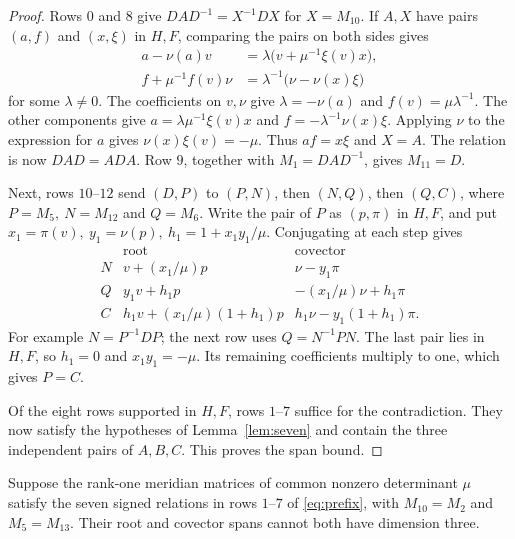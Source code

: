 \begin{proof}
Rows \(0\) and \(8\) give \(DAD^{-1}=X^{-1}DX\) for
\(X=M_{10}\). If \(A,X\) have pairs \((a,f)\) and \((x,\xi)\)
in \(H,F\), comparing the pairs on both sides gives
\[
 \begin{aligned}
 a-\nu(a)v &= \lambda\bigl(v+\mu^{-1}\xi(v)x\bigr),\\
 f+\mu^{-1}f(v)\nu &= \lambda^{-1}\bigl(\nu-\nu(x)\xi\bigr)
 \end{aligned}
\]
for some \(\lambda\ne 0\). The coefficients on \(v,\nu\)
give \(\lambda=-\nu(a)\) and \(f(v)=\mu\lambda^{-1}\).
The other components give
\(a=\lambda\mu^{-1}\xi(v)x\) and \(f=-\lambda^{-1}\nu(x)\xi\).
Applying \(\nu\) to the expression for \(a\) gives
\(\nu(x)\xi(v)=-\mu\). Thus \(af=x\xi\) and \(X=A\).
The relation is now \(DAD=ADA\).
Row \(9\), together with \(M_1=DAD^{-1}\), gives \(M_{11}=D\).

Next, rows \(10\)--\(12\) send \((D,P)\) to \((P,N)\),
then \((N,Q)\), then \((Q,C)\), where \(P=M_5,\ N=M_{12}\)
and \(Q=M_6\). Write the pair of \(P\) as \((p,\pi)\) in
\(H,F\), and put \(x_1=\pi(v),\ y_1=\nu(p),\
h_1=1+x_1y_1/\mu\). Conjugating at each step gives
\[
\begin{array}{c|cc}
 &\text{root}&\text{covector}\\ \hline
N&v+(x_1/\mu)p&\nu-y_1\pi\\
Q&y_1v+h_1p&-(x_1/\mu)\nu+h_1\pi\\
C&h_1v+(x_1/\mu)(1+h_1)p&h_1\nu-y_1(1+h_1)\pi.
\end{array}
\]
For example \(N=P^{-1}DP\); the next row uses \(Q=N^{-1}PN\).
The last pair lies in \(H,F\), so \(h_1=0\) and
\(x_1y_1=-\mu\). Its remaining coefficients multiply to one,
which gives \(P=C\).

Of the eight rows supported in \(H,F\), rows \(1\)--\(7\)
suffice for the contradiction. They now satisfy the hypotheses
of Lemma~\ref{lem:seven} and contain the three independent pairs
of \(A,B,C\). This proves the span bound.
\end{proof}

\begin{lemma}\label{lem:seven}
Suppose the rank-one meridian matrices of common nonzero
determinant \(\mu\) satisfy the seven signed relations in
rows \(1\)--\(7\) of \eqref{eq:prefix}, with
\(M_{10}=M_2\) and \(M_5=M_{13}\). Their root and covector
spans cannot both have dimension three.
\end{lemma}

